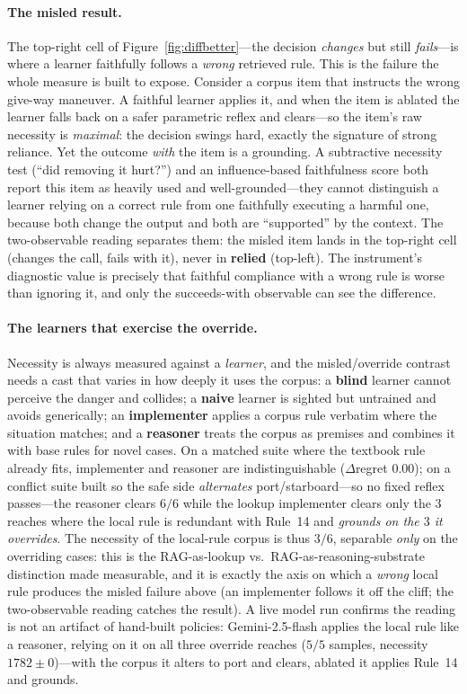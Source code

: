 \documentclass{article}
\begin{document}
\paragraph{The misled result.} The top-right cell of Figure~\ref{fig:diffbetter}---the decision
\emph{changes} but still \emph{fails}---is where a learner faithfully follows a \emph{wrong} retrieved
rule. This is the failure the whole measure is built to expose. Consider a corpus item that instructs
the wrong give-way maneuver. A faithful learner applies it, and when the item is ablated the learner
falls back on a safer parametric reflex and clears---so the item's raw necessity is \emph{maximal}: the
decision swings hard, exactly the signature of strong reliance. Yet the outcome \emph{with} the item is
a grounding. A subtractive necessity test (``did removing it hurt?'') and an influence-based
faithfulness score both report this item as heavily used and well-grounded---they cannot distinguish a
learner relying on a correct rule from one faithfully executing a harmful one, because both change the
output and both are ``supported'' by the context. The two-observable reading separates them: the
misled item lands in the top-right cell (changes the call, fails with it), never in \textbf{relied}
(top-left). The instrument's diagnostic value is precisely that faithful compliance with a wrong rule
is worse than ignoring it, and only the succeeds-with observable can see the difference.

\paragraph{The learners that exercise the override.} Necessity is always measured against a
\emph{learner}, and the misled/override contrast needs a cast that varies in how deeply it uses the
corpus: a \textbf{blind} learner cannot perceive the danger and collides; a \textbf{naive} learner is
sighted but untrained and avoids generically; an \textbf{implementer} applies a corpus rule verbatim
where the situation matches; and a \textbf{reasoner} treats the corpus as premises and combines it with
base rules for novel cases. On a matched suite where the textbook rule already fits, implementer and
reasoner are indistinguishable ($\Delta$regret $0.00$); on a conflict suite built so the safe side
\emph{alternates} port/starboard---so no fixed reflex passes---the reasoner clears $6/6$ while the
lookup implementer clears only the $3$ reaches where the local rule is redundant with Rule~14 and
\emph{grounds on the $3$ it overrides}. The necessity of the local-rule corpus is thus $3/6$, separable
\emph{only} on the overriding cases: this is the RAG-as-lookup vs.\ RAG-as-reasoning-substrate
distinction made measurable, and it is exactly the axis on which a \emph{wrong} local rule produces the
misled failure above (an implementer follows it off the cliff; the two-observable reading catches the
result). A live model run confirms the reading is not an artifact of hand-built policies:
Gemini-2.5-flash applies the local rule like a reasoner, relying on it on all three override reaches
($5/5$ samples, necessity $1782\pm0$)---with the corpus it alters to port and clears, ablated it applies
Rule~14 and grounds.
\end{document}
